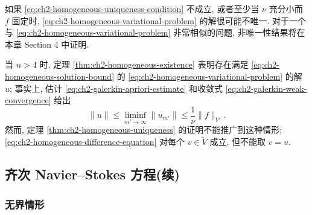\begin{Remark}
\label{rem:ch2-homogeneous-possible-nonuniqueness}
如果 \eqref{eq:ch2-homogeneous-uniqueness-condition} 不成立, 或者至少当 $\nu$ 充分小而 $f$ 固定时, \eqref{eq:ch2-homogeneous-variational-problem} 的解很可能不唯一. 对于一个与 \eqref{eq:ch2-homogeneous-variational-problem} 非常相似的问题, 非唯一性结果将在本章 Section 4 中证明.
\end{Remark}

\begin{Remark}
\label{rem:ch2-homogeneous-high-dimension}
当 $n>4$ 时, 定理 \ref{thm:ch2-homogeneous-existence} 表明存在满足 \eqref{eq:ch2-homogeneous-solution-bound} 的 \eqref{eq:ch2-homogeneous-variational-problem} 的解 $u$; 事实上, 估计 \eqref{eq:ch2-galerkin-apriori-estimate} 和收敛式 \eqref{eq:ch2-galerkin-weak-convergence} 给出
\begin{equation}
\lVert u\rVert\leq\liminf_{m'\to\infty}\lVert u_{m'}\rVert
\leq\frac1\nu\lVert f\rVert_{V'}.
\label{eq:ch2-homogeneous-high-dimensional-bound}
\end{equation}
然而, 定理 \ref{thm:ch2-homogeneous-uniqueness} 的证明不能推广到这种情形; \eqref{eq:ch2-homogeneous-difference-equation} 对每个 $v\in\widetilde V$ 成立, 但不能取 $v=u$.
\end{Remark}

\hypertarget{chapter-02-page-128}{}
\subsection{齐次 Navier--Stokes 方程(续)}
\label{subsec:ch2-homogeneous-navier-stokes-unbounded}

\subsubsection*{无界情形}

